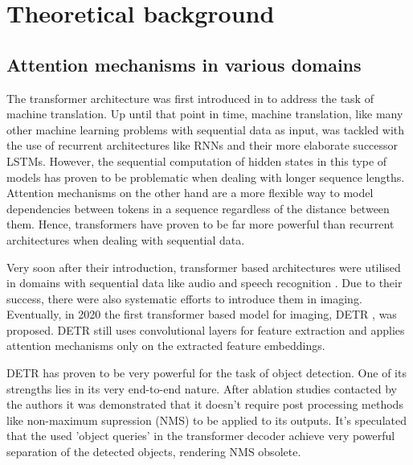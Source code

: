 \chapter{Theoretical background}\label{chapter:attention_in_imaging}
\section{Attention mechanisms in various domains}
The transformer architecture was first introduced in \cite{AttentionIsAllYouNeed} to address the task of machine translation. Up until that point in time, machine translation, like many other machine learning problems with sequential data as input, was tackled with the use of recurrent architectures like RNNs and their more elaborate successor LSTMs. However, the sequential computation of hidden states in this type of models has proven to be problematic when dealing with longer sequence lengths. Attention mechanisms on the other hand are a more flexible way to model dependencies between tokens in a sequence regardless of the distance between them. Hence, transformers have proven to be far more powerful than recurrent architectures when dealing with sequential data. \par
Very soon after their introduction, transformer based architectures were utilised in domains with sequential data like audio and speech recognition \cite{DETR}. Due to their success, there were also systematic efforts to introduce them in imaging. Eventually, in 2020 the first transformer based model for imaging, DETR \cite{DETR}, was proposed. DETR still uses convolutional layers for feature extraction and applies attention mechanisms only on the extracted feature embeddings.\par
DETR has proven to be very powerful for the task of object detection. One of its strengths lies in its very end-to-end nature. After ablation studies contacted by the authors it was demonstrated that it doesn't require post processing methods like non-maximum supression (NMS) to be applied to its outputs. It's speculated that the used 'object queries' in the transformer decoder achieve very powerful separation of the detected objects, rendering NMS obsolete. \par
